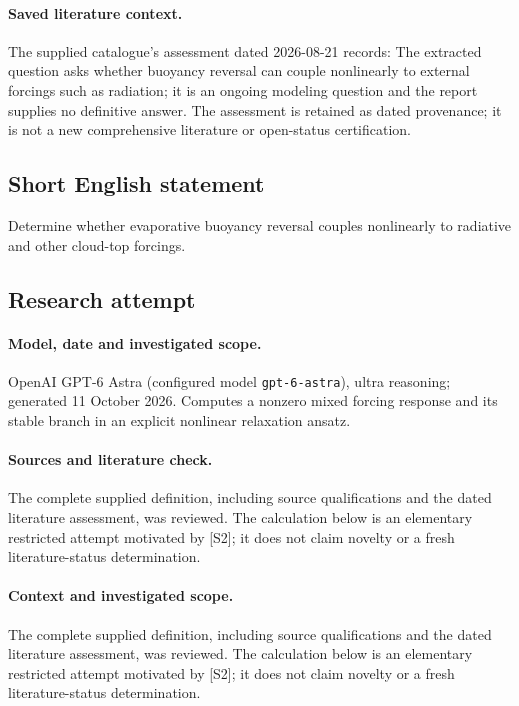 \documentclass[11pt]{article}
\begin{document}
\paragraph{Saved literature context.} The supplied catalogue's assessment dated 2026-08-21 records: The extracted question asks whether buoyancy reversal can couple nonlinearly to external forcings such as radiation; it is an ongoing modeling question and the report supplies no definitive answer. The assessment is retained as dated provenance; it is not a new comprehensive literature or open-status certification.
\subsection{Short English statement}
Determine whether evaporative buoyancy reversal couples nonlinearly to radiative and other cloud-top forcings.
\subsection{Research attempt}
\paragraph{Model, date and investigated scope.}
OpenAI GPT-6 Astra (configured model \texttt{gpt-6-astra}), ultra reasoning; generated 11 October 2026. Computes a nonzero mixed forcing response and its stable branch in an explicit nonlinear relaxation ansatz.

\paragraph{Sources and literature check.}
The complete supplied definition, including source qualifications and the dated literature assessment, was reviewed. The calculation below is an elementary restricted attempt motivated by [S2]; it does not claim novelty or a fresh literature-status determination.

\paragraph{Context and investigated scope.} The complete supplied definition, including source qualifications and the dated literature assessment, was reviewed. The calculation below is an elementary restricted attempt motivated by [S2]; it does not claim novelty or a fresh literature-status determination.
\end{document}
